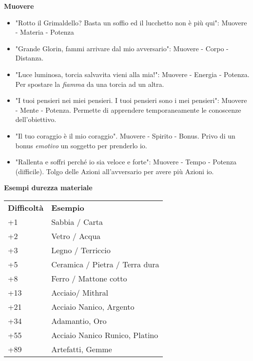 \documentclass[a4paper,twoside,openany]{book}
\begin{document}
\begin{multicols}{2}
\textbf{Muovere}
\begin{itemize}[leftmargin=*] \setlength{\itemsep}{0pt}	
\item "Rotto il Grimaldello? Basta un soffio ed il lucchetto non è più qui": Muovere - Materia - Potenza
\item "Grande Glorin, fammi arrivare dal mio avversario": Muovere - Corpo - Distanza.
\item "Luce luminosa, torcia salvavita vieni alla mia!": Muovere - Energia - Potenza. Per spostare la \emph{fiamma} da una torcia ad un altra.
\item "I tuoi pensieri nei miei pensieri. I tuoi pensieri sono i mei pensieri": Muovere - Mente - Potenza. Permette di apprendere temporaneamente le conoscenze dell'obiettivo.
\item "Il tuo coraggio è il mio coraggio". Muovere - Spirito - Bonus. Privo di un bonus \emph{emotivo} un soggetto per prenderlo io.
\item "Rallenta e soffri perché io sia veloce e forte": Muovere - Tempo - Potenza (difficile). Tolgo delle Azioni all'avversario per avere più Azioni io.
\end{itemize}

\bigskip

\textbf{Esempi durezza materiale}

\medskip
\begin{tabular}{ll}
	\toprule
	\textbf{Difficoltà}	&  \textbf{Esempio}\\
	+1                  &  Sabbia / Carta \\
	+2                  &  Vetro / Acqua\\
	+3                  &  Legno / Terriccio\\
	+5                  &  Ceramica / Pietra / Terra dura\\
	+8                  &  Ferro / Mattone cotto\\
	+13                 &  Acciaio/ Mithral\\
	+21                 &  Acciaio Nanico, Argento\\
	+34                 &  Adamantio, Oro\\
	+55                 &  Acciaio Nanico Runico, Platino\\
	+89                 &  Artefatti, Gemme\\
\end{tabular}




\end{multicols}
\end{document}
